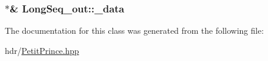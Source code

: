 \subsubsection[{\texorpdfstring{\+\_\+data}{_data}}]{$\ast$\& Long\+Seq\+\_\+out\+::\+\_\+data}\hypertarget{class_long_seq__out_a58e06f54c45bad600b77383a4229b539}{}\label{class_long_seq__out_a58e06f54c45bad600b77383a4229b539}


The documentation for this class was generated from the following file\+:\begin{DoxyCompactItemize}
\item 
hdr/\hyperlink{_petit_prince_8hpp}{Petit\+Prince.\+hpp}\end{DoxyCompactItemize}
